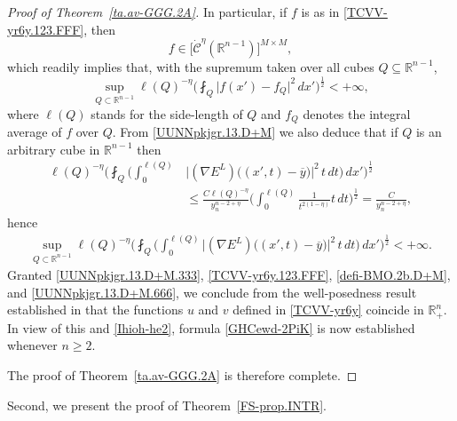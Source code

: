 \documentclass[11pt,reqno]{amsart}
\numberwithin{equation}{section}
\theoremstyle{remark}
\begin{document}
\begin{proof}[Proof of Theorem~\ref{ta.av-GGG.2A}]
In particular, if $f$ is as in \eqref{TCVV-yr6y.123.FFF}, then
%
\begin{equation}\label{UUNNpkjgr.13.D+M.444.bis}
f\in\big[\dot{\mathscr{C}}^\eta({\mathbb{R}}^{n-1})\big]^{M\times M},
\end{equation}
%
which readily implies that, with the supremum taken over all cubes $Q\subseteq{\mathbb{R}}^{n-1}$, 
%
\begin{equation}\label{defi-BMO.2b.D+M}
\sup_{Q\subset\mathbb{R}^{n-1}}\ell(Q)^{-\eta}\Big(\fint_{Q}\big|f(x')-f_Q\big|^2\,dx'\Big)^{\frac{1}{2}}<+\infty,
\end{equation}
%
where $\ell(Q)$ stands for the side-length of $Q$ and $f_Q$ denotes the integral average of $f$ over $Q$. 
From \eqref{UUNNpkjgr.13.D+M} we also deduce that if $Q$ is an arbitrary cube in $\mathbb{R}^{n-1}$ then 
%
\begin{align}\label{UUNNpkjgr.13.D+M.555}
\ell(Q)^{-\eta}\Big(\fint_{Q}\Big(\int_{0}^{\ell(Q)} &\big|(\nabla E^L)\big((x',t)-\overline{y}\big)\big|^2\,t\,dt\Big)\,dx'\Big)^\frac{1}{2}
\nonumber\\[4pt]
&\leq\frac{C\ell(Q)^{-\eta}}{y_n^{n-2+\eta}}\Big(\int_{0}^{\ell(Q)}\frac{1}{t^{2(1-\eta)}}t\,dt\Big)^\frac{1}{2}
=\frac{C}{y_n^{n-2+\eta}},
\end{align}
%
hence 
%
\begin{align}\label{UUNNpkjgr.13.D+M.666}
\sup_{Q\subset\mathbb{R}^{n-1}}
\ell(Q)^{-\eta}\Big(\fint_{Q}\Big(\int_{0}^{\ell(Q)}\big|(\nabla E^L)\big((x',t)-\overline{y}\big)\big|^2\,t\,dt\Big)\,dx'\Big)^\frac{1}{2}
<+\infty.
\end{align}
%
Granted \eqref{UUNNpkjgr.13.D+M.333}, \eqref{TCVV-yr6y.123.FFF}, \eqref{defi-BMO.2b.D+M}, and \eqref{UUNNpkjgr.13.D+M.666}, 
we conclude from the well-posedness result established in \cite[Theorem~1.21]{MMMM16} that the functions 
$u$ and $v$ defined in \eqref{TCVV-yr6y} coincide in ${\mathbb{R}}^n_{+}$. In view of this and \eqref{Ihioh-he2}, 
formula \eqref{GHCewd-2PiK} is now established whenever $n\geq 2$. 

\vskip 0.08in
The proof of Theorem~\ref{ta.av-GGG.2A} is therefore complete. 
\end{proof}

Second, we present the proof of Theorem~\ref{FS-prop.INTR}.
\end{document}
